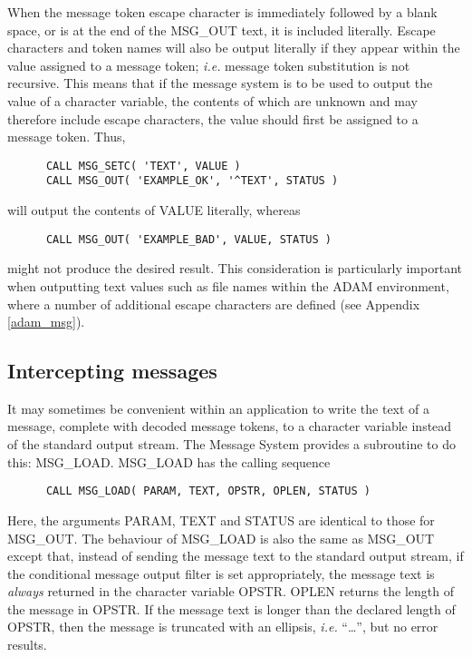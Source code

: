 When the message token escape character is immediately followed by a blank
space, or is at the end of the MSG\_OUT text, it is included literally. 
Escape characters and token names will also be output literally if they 
appear within the value assigned to a message token; {\em i.e.} message token 
substitution is not recursive.
This means that if the message system is to be used to output the value of a 
character variable, the contents of which are unknown and may therefore 
include escape characters, the value should first be assigned to a message 
token.
Thus,

\begin {small}
\begin {verbatim}
      CALL MSG_SETC( 'TEXT', VALUE )
      CALL MSG_OUT( 'EXAMPLE_OK', '^TEXT', STATUS )
\end{verbatim}
\end {small}

will output the contents of VALUE literally, whereas

\begin {small}
\begin{verbatim}
      CALL MSG_OUT( 'EXAMPLE_BAD', VALUE, STATUS )
\end{verbatim}
\end {small}

might not produce the desired result.
This consideration is particularly important when outputting text values 
such as file names within the ADAM environment, where a number of additional 
escape characters are defined (see Appendix \ref{adam_msg}).


\subsection {Intercepting messages} \label{inter_sect}

It may sometimes be convenient within an application to write the text of a 
message, complete with decoded message tokens, to a character variable 
instead of the standard output stream.
The Message System provides a subroutine to do this: MSG\_LOAD.
MSG\_LOAD has the calling sequence

\begin {small}
\begin{verbatim}
      CALL MSG_LOAD( PARAM, TEXT, OPSTR, OPLEN, STATUS )
\end{verbatim}
\end {small}

Here, the arguments PARAM, TEXT and STATUS are identical to those for MSG\_OUT.
The behaviour of MSG\_LOAD is also the same as MSG\_OUT except that, instead of
sending the message text to the standard output stream, if the conditional 
message output filter is set appropriately, the message text is {\em always}
returned in the character variable OPSTR.
OPLEN returns the length of the message in OPSTR.
If the message text is longer than the declared length of OPSTR, then the
message is truncated with an ellipsis, {\em i.e.} ``\ldots'', but no error 
results.

